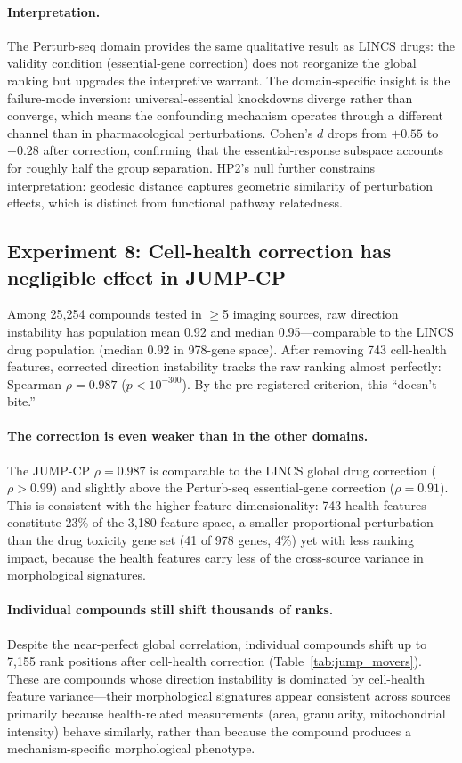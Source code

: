 \documentclass{article}
\begin{document}
\paragraph{Interpretation.}
The Perturb-seq domain provides the same qualitative result as LINCS drugs:
the validity condition (essential-gene correction) does not reorganize the
global ranking but upgrades the interpretive warrant. The domain-specific
insight is the failure-mode inversion: universal-essential knockdowns
diverge rather than converge, which means the confounding mechanism operates
through a different channel than in pharmacological perturbations. Cohen's $d$
drops from $+0.55$ to $+0.28$ after correction, confirming that the
essential-response subspace accounts for roughly half the group separation.
HP2's null further constrains interpretation: geodesic distance captures
geometric similarity of perturbation effects, which is distinct from
functional pathway relatedness.

\subsection{Experiment 8: Cell-health correction has negligible effect in JUMP-CP}

Among 25{,}254 compounds tested in $\geq$5 imaging sources, raw direction
instability has population mean 0.92 and median 0.95---comparable to the
LINCS drug population (median 0.92 in 978-gene space). After removing 743
cell-health features, corrected direction instability tracks the raw ranking
almost perfectly: Spearman $\rho = 0.987$ ($p < 10^{-300}$). By the
pre-registered criterion, this ``doesn't bite.''

\paragraph{The correction is even weaker than in the other domains.}
The JUMP-CP $\rho = 0.987$ is comparable to the LINCS global drug
correction ($\rho > 0.99$) and slightly above the Perturb-seq
essential-gene correction ($\rho = 0.91$). This
is consistent with the higher feature dimensionality: 743 health features
constitute 23\% of the 3{,}180-feature space, a smaller proportional
perturbation than the drug toxicity gene set (41 of 978 genes, 4\%) yet
with less ranking impact, because the health features carry less of the
cross-source variance in morphological signatures.

\paragraph{Individual compounds still shift thousands of ranks.}
Despite the near-perfect global correlation, individual compounds shift up
to 7{,}155 rank positions after cell-health correction
(Table~\ref{tab:jump_movers}). These are compounds whose direction
instability is dominated by cell-health feature variance---their
morphological signatures appear consistent across sources primarily because
health-related measurements (area, granularity, mitochondrial intensity)
behave similarly, rather than because the compound produces a
mechanism-specific morphological phenotype.
\end{document}
